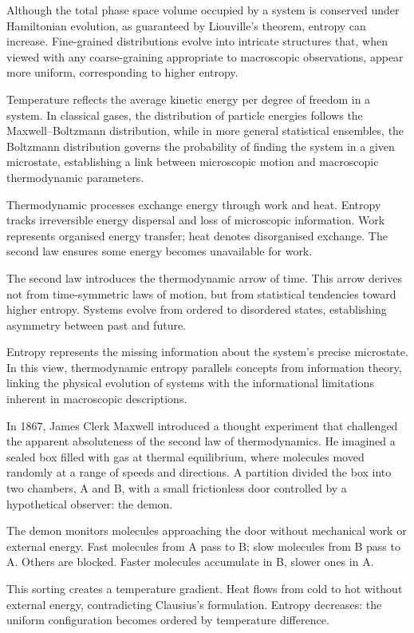 Although the total phase space volume occupied by a system is conserved under Hamiltonian evolution, as guaranteed by Liouville's theorem, entropy can increase. Fine-grained distributions evolve into intricate structures that, when viewed with any coarse-graining appropriate to macroscopic observations, appear more uniform, corresponding to higher entropy.

Temperature reflects the average kinetic energy per degree of freedom in a system. In classical gases, the distribution of particle energies follows the Maxwell–Boltzmann distribution, while in more general statistical ensembles, the Boltzmann distribution governs the probability of finding the system in a given microstate, establishing a link between microscopic motion and macroscopic thermodynamic parameters.

Thermodynamic processes exchange energy through work and heat. Entropy tracks irreversible energy dispersal and loss of microscopic information. Work represents organised energy transfer; heat denotes disorganised exchange. The second law ensures some energy becomes unavailable for work.

The second law introduces the thermodynamic arrow of time. This arrow derives not from time-symmetric laws of motion, but from statistical tendencies toward higher entropy. Systems evolve from ordered to disordered states, establishing asymmetry between past and future.

Entropy represents the missing information about the system's precise microstate. In this view, thermodynamic entropy parallels concepts from information theory, linking the physical evolution of systems with the informational limitations inherent in macroscopic descriptions.

In 1867, James Clerk Maxwell introduced a thought experiment that challenged the apparent absoluteness of the second law of thermodynamics. He imagined a sealed box filled with gas at thermal equilibrium, where molecules moved randomly at a range of speeds and directions. A partition divided the box into two chambers, A and B, with a small frictionless door controlled by a hypothetical observer: the demon.

The demon monitors molecules approaching the door without mechanical work or external energy. Fast molecules from A pass to B; slow molecules from B pass to A. Others are blocked. Faster molecules accumulate in B, slower ones in A.

This sorting creates a temperature gradient. Heat flows from cold to hot without external energy, contradicting Clausius's formulation. Entropy decreases: the uniform configuration becomes ordered by temperature difference.

